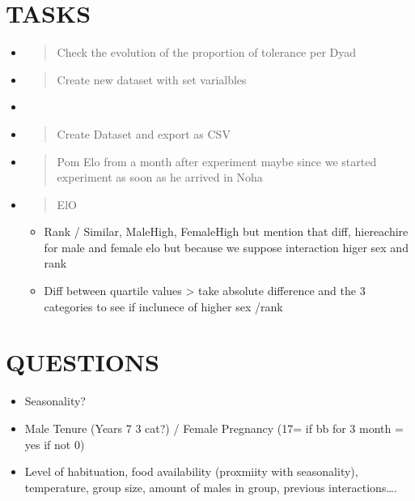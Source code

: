 \documentclass[
]{article}
\providecommand{\tightlist}{%
  \setlength{\itemsep}{0pt}\setlength{\parskip}{0pt}}
\begin{document}
\hypertarget{tasks}{%
\section{TASKS}\label{tasks}}

\begin{itemize}
\item
  \begin{quote}
  Check the evolution of the proportion of tolerance per Dyad
  \end{quote}
\item
  \begin{quote}
  Create new dataset with set varialbles
  \end{quote}
\item
  \begin{quote}
  \end{quote}
\item
  \begin{quote}
  Create Dataset and export as CSV
  \end{quote}
\item
  \begin{quote}
  Pom Elo from a month after experiment maybe since we started
  experiment as soon as he arrived in Noha
  \end{quote}
\item
  \begin{quote}
  ElO
  \end{quote}

  \begin{itemize}
  \tightlist
  \item
    Rank / Similar, MaleHigh, FemaleHigh but mention that diff,
    hiereachire for male and female elo but because we suppose
    interaction higer sex and rank
  \item
    Diff between quartile values \textgreater{} take absolute difference
    and the 3 categories to see if inclunece of higher sex /rank
  \end{itemize}
\end{itemize}

\hypertarget{questions}{%
\section{QUESTIONS}\label{questions}}

\begin{itemize}
\tightlist
\item
  Seasonality?
\item
  Male Tenure (Years 7 3 cat?) / Female Pregnancy (17= if bb for 3 month
  = yes if not 0)
\item
  Level of habituation, food availability (proxmiity with seasonality),
  temperature, group size, amount of males in group, previous
  interactions\ldots.
\end{itemize}
\end{document}
